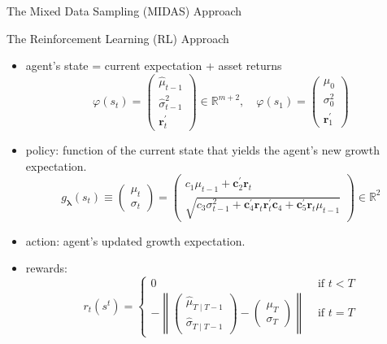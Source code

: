 \documentclass[UTF8, 16pt]{beamer}
\begin{document}
\begin{CJK*}{UTF8}{gbsn}
\begin{frame}{The Mixed Data Sampling (MIDAS) Approach}
\end{frame}
\begin{frame}{The Reinforcement Learning (RL) Approach}
	\begin{itemize}
		\item agent's state = current expectation + asset returns
			$$
			\varphi\left(s_{t}\right)=\left(\begin{array}{c}\hat{\mu}_{t-1} \\ \hat{\sigma}_{t-1}^{2} \\ \mathbf{r}_{t}^{\prime}\end{array}\right) \in \mathbb{R}^{m+2}, \quad 
			\varphi\left(s_{1}\right)=\left(\begin{array}{c}\mu_{0} \\ \sigma_{0}^{2} \\ \mathbf{r}_{1}^{\prime}\end{array}\right)
			$$
		\item policy: function of the current state that yields the agent's new growth expectation.
			$$
			g_{\boldsymbol{\lambda}}\left(s_{t}\right) \equiv\left(\begin{array}{c}\mu_{t} \\ \sigma_{t}\end{array}\right)=\left(\begin{array}{c}c_{1} \mu_{t-1}+\mathbf{c}_{2}^{\prime} \mathbf{r}_{t} \\ \sqrt{c_{3} \sigma_{t-1}^{2}+\mathbf{c}_{4}^{\prime} \mathbf{r}_{t} \mathbf{r}_{t}^{\prime} \mathbf{c}_{4}+\mathbf{c}_{5}^{\prime} \mathbf{r}_{t} \mu_{t-1}}\end{array}\right) \in \mathbb{R}^{2}
			$$
		\item action: agent's updated growth expectation.
		\item rewards:
			$$r_{t}\left(s^{t}\right)=\left\{\begin{array}{ll}0 & \text { if } t<T \\ -\left\|\left(\begin{array}{c}\hat{\mu}_{T \mid T-1} \\ \hat{\sigma}_{T \mid T-1}\end{array}\right)-\left(\begin{array}{c}\mu_{T} \\ \sigma_{T}\end{array}\right)\right\| & \text { if } t=T\end{array}\right.$$
	\end{itemize}
\end{frame}

\end{CJK*}
\end{document}
